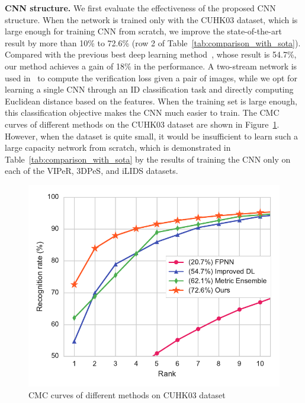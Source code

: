 \textbf{CNN structure.} We first evaluate the effectiveness of the proposed CNN structure. When the network is trained only with the CUHK03 dataset, which is large enough for training CNN from scratch, we improve the state-of-the-art result by more than 10\% to 72.6\% (row 2 of Table~\ref{tab:comparison_with_sota}). Compared with the previous best deep learning method~\cite{ahmed2015improved}, whose result is 54.7\%, our method achieves a gain of 18\% in the performance. A two-stream network is used in~\cite{ahmed2015improved} to compute the verification loss given a pair of images, while we opt for learning a single CNN through an ID classification task and directly computing Euclidean distance based on the features. When the training set is large enough, this classification objective makes the CNN much easier to train. The CMC curves of different methods on the CUHK03 dataset are shown in Figure~\ref{fig:cmc_cuhk03}. However, when the dataset is quite small, it would be insufficient to learn such a large capacity network from scratch, which is demonstrated in Table~\ref{tab:comparison_with_sota} by the results of training the CNN only on each of the VIPeR, 3DPeS, and iLIDS datasets.

\begin{figure}[t]
\begin{center}
\includegraphics[width=0.8\linewidth]{figures/multi_domain/cmc_cuhk03.pdf}
\end{center}
\caption{CMC curves of different methods on CUHK03 dataset}
\label{fig:cmc_cuhk03}
\end{figure}

